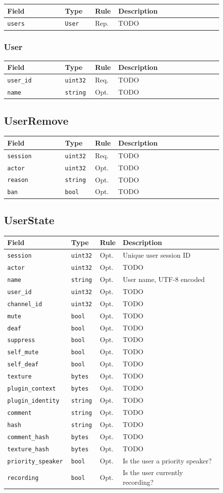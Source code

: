 \documentclass[11pt]{article} %
\newenvironment{mumbleMessageEx}
{%
	\small
	\renewcommand\arraystretch{1.5}
	\begin{tabular}{p{0.25\linewidth}p{0.13\linewidth}p{0.05\linewidth}p{0.45\linewidth}}
	Field & Type & Rule & Description \\
	\hline
}
{%
	\end{tabular}
	\renewcommand\arraystretch{1.0}
}
\newcommand{\mumbleMessageExItem}[4]{ \texttt{#1} & \texttt{#2} & #3 & #4 \\ }
\begin{document}
\begin{mumbleMessageEx}
\mumbleMessageExItem{users}{User}{Rep.}{TODO}
\end{mumbleMessageEx}

\subsubsection{User}

\begin{mumbleMessageEx}
\mumbleMessageExItem{user\_id}{uint32}{Req.}{TODO}
\mumbleMessageExItem{name}{string}{Opt.}{TODO}
\end{mumbleMessageEx}

\subsection{UserRemove}

\begin{mumbleMessageEx}
\mumbleMessageExItem{session}{uint32}{Req.}{TODO}
\mumbleMessageExItem{actor}{uint32}{Opt.}{TODO}
\mumbleMessageExItem{reason}{string}{Opt.}{TODO}
\mumbleMessageExItem{ban}{bool}{Opt.}{TODO}
\end{mumbleMessageEx}

\subsection{UserState}
\label{msg:userState}

\begin{mumbleMessageEx}
\mumbleMessageExItem{session}{uint32}{Opt.}{Unique user session ID}
\mumbleMessageExItem{actor}{uint32}{Opt.}{TODO}
\mumbleMessageExItem{name}{string}{Opt.}{User name, UTF-8 encoded}
\mumbleMessageExItem{user\_id}{uint32}{Opt.}{TODO}
\mumbleMessageExItem{channel\_id}{uint32}{Opt.}{TODO}
\mumbleMessageExItem{mute}{bool}{Opt.}{TODO}
\mumbleMessageExItem{deaf}{bool}{Opt.}{TODO}
\mumbleMessageExItem{suppress}{bool}{Opt.}{TODO}
\mumbleMessageExItem{self\_mute}{bool}{Opt.}{TODO}
\mumbleMessageExItem{self\_deaf}{bool}{Opt.}{TODO}
\mumbleMessageExItem{texture}{bytes}{Opt.}{TODO}
\mumbleMessageExItem{plugin\_context}{bytes}{Opt.}{TODO}
\mumbleMessageExItem{plugin\_identity}{string}{Opt.}{TODO}
\mumbleMessageExItem{comment}{string}{Opt.}{TODO}
\mumbleMessageExItem{hash}{string}{Opt.}{TODO}
\mumbleMessageExItem{comment\_hash}{bytes}{Opt.}{TODO}
\mumbleMessageExItem{texture\_hash}{bytes}{Opt.}{TODO}
\mumbleMessageExItem{priority\_speaker}{bool}{Opt.}{Is the user a priority speaker?}
\mumbleMessageExItem{recording}{bool}{Opt.}{Is the user currently recording?}
\end{mumbleMessageEx}
\end{document}
